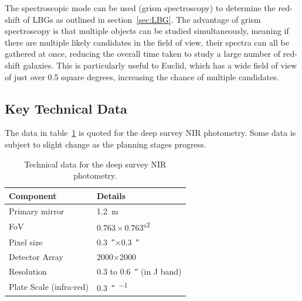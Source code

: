 		The spectroscopic mode can be used (grism spectroscopy) to determine the red-shift of LBGs as outlined in section~\ref{sec:LBG}. The advantage of grism spectroscopy is that multiple objects can be studied simultaneously, meaning if there are multiple likely candidates in the field of view, their spectra can all be gathered at once, reducing the overall time taken to study a large number of red-shift galaxies. This is particularly useful to Euclid, which has a wide field of view of just over 0.5 square degrees, increasing the chance of multiple candidates.

	\subsection{Key Technical Data} %
	\label{sub:key_technical_data}
		The data in table~\ref{tab:Euclid_technical} is quoted for the deep survey NIR photometry. Some data is subject to slight change as the planning stages progress.
		\begin{table}[ht]
			\begin{center}
				\begin{tabular}{l|l}
					Component & Details \\
					\hline\hline
					Primary mirror		& \SI{1.2}{\metre} \\ \hline
					FoV 				& $0.763\times0.763$\si{\degree\squared} \\ \hline
					Pixel size			& \SI{0.3}{\arcsecond}$\times$\SI{0.3}{\arcsecond} \\ \hline
					Detector Array		& \num{2000}$\times$\num{2000}\,\si{\pixel} \\ \hline
					Resolution 			& 0.3 to \SI{0.6}{\arcsecond} (in J band) \\ \hline
					Plate Scale (infra-red)	& \SI{0.3}{\arcsecond\per\pixel}
				\end{tabular}
			\end{center}
			\caption{Technical data for the deep survey NIR photometry\cite{Euclid_Definition_Study_Report}.\label{tab:Euclid_technical}}
		\end{table}
